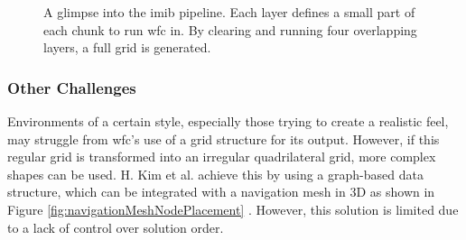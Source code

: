 \begin{figure}[H]
    \hfill
    \caption{A glimpse into the \acrshort{imib} pipeline. Each layer defines a small part of each chunk to run \acrshort{wfc} in. By clearing and running four overlapping layers, a full grid is generated. \cite{Infinite_Modifying_In_Blocks}}
    \label{fig:imib}
\end{figure}

\subsubsection{Other Challenges}
Environments of a certain style, especially those trying to create a realistic feel, may struggle from \acrshort{wfc}'s use of a grid structure for its output. However, if this regular grid is transformed into an irregular quadrilateral grid, more complex shapes can be used. H. Kim et al. achieve this by using a graph-based data structure, which can be integrated with a navigation mesh in 3D as shown in Figure \ref{fig:navigationMeshNodePlacement} \cite{WFC_Graph-based}. However, this solution is limited due to a lack of control over solution order.


